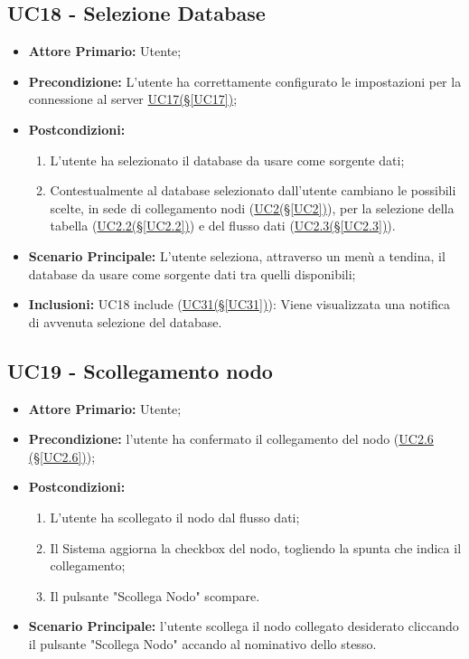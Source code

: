 \pagebreak

\subsection{UC18 - Selezione Database}\label{UC18}
\begin{itemize}
	\item \textbf{Attore Primario:} Utente;
	\item \textbf{Precondizione:} L'utente ha correttamente configurato le impostazioni per la connessione al server \hyperref[UC17]{UC17(§\ref*{UC17})};
	\item \textbf{Postcondizioni:}
	\begin{enumerate}
		\item L'utente ha selezionato il database da usare come sorgente dati;
		\item Contestualmente al database selezionato dall'utente cambiano le possibili scelte, in sede di collegamento nodi (\hyperref[UC2]{UC2(§\ref*{UC2})}), per la selezione della tabella (\hyperref[UC2.2]{UC2.2(§\ref*{UC2.2})}) e del flusso dati (\hyperref[UC2.3]{UC2.3(§\ref*{UC2.3})}).
	\end{enumerate}
	\item \textbf{Scenario Principale:} L'utente seleziona, attraverso un menù a tendina, il database da usare come sorgente dati tra quelli disponibili;
	\item \textbf{Inclusioni:} UC18 include (\hyperref[UC31]{UC31(§\ref*{UC31})}): Viene visualizzata una notifica di avvenuta selezione del database.
\end{itemize}

\pagebreak

\subsection{UC19 - Scollegamento nodo}\label{UC19}
\begin{itemize}
	\item \textbf{Attore Primario:} Utente;
	\item \textbf{Precondizione:} l'utente ha confermato il collegamento del nodo (\hyperref[UC2.6]{UC2.6 									(§\ref*{UC2.6})});
	\item \textbf{Postcondizioni:}
	\begin{enumerate}
		\item L'utente ha scollegato il nodo dal flusso dati;
		\item Il Sistema aggiorna la checkbox del nodo, togliendo la spunta che indica il collegamento;
		\item Il pulsante "Scollega Nodo" scompare.
	\end{enumerate}
	\item \textbf{Scenario Principale:} l'utente scollega il nodo collegato desiderato cliccando il pulsante "Scollega Nodo" accando al nominativo dello stesso.
\end{itemize}

